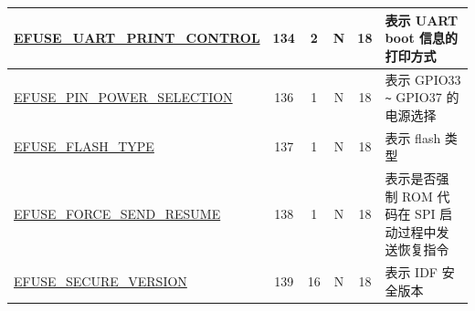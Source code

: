 \begin{longtable}[l]{ |m{5.2cm}|c|c|c|c|m{5.5cm}| }
    \hline
    \hyperref[fielddesc:EFUSEUARTPRINTCONTROL]{EFUSE\_UART\_PRINT\_CONTROL} & 134 & 2 & N & 18 & 表示 UART boot 信息的打印方式 \\
    \hline
    \hyperref[fielddesc:EFUSEPINPOWERSELECTION]{EFUSE\_PIN\_POWER\_SELECTION} & 136 & 1 & N & 18 & 表示 GPIO33 \verb+~+ GPIO37 的电源选择 \\
    \hline
    \hyperref[fielddesc:EFUSEFLASHTYPE]{EFUSE\_FLASH\_TYPE} & 137 & 1 & N & 18 & 表示 flash 类型 \\
    \hline
    \hyperref[fielddesc:EFUSEFORCESENDRESUME]{EFUSE\_FORCE\_SEND\_RESUME} & 138 & 1 & N & 18 & 表示是否强制 ROM 代码在 SPI 启动过程中发送恢复指令 \\  
    \hline
    \hyperref[fielddesc:EFUSESECUREVERSION]{EFUSE\_SECURE\_VERSION} & 139 & 16 & N & 18 & 表示 IDF 安全版本 \\\hline
\end{longtable}
